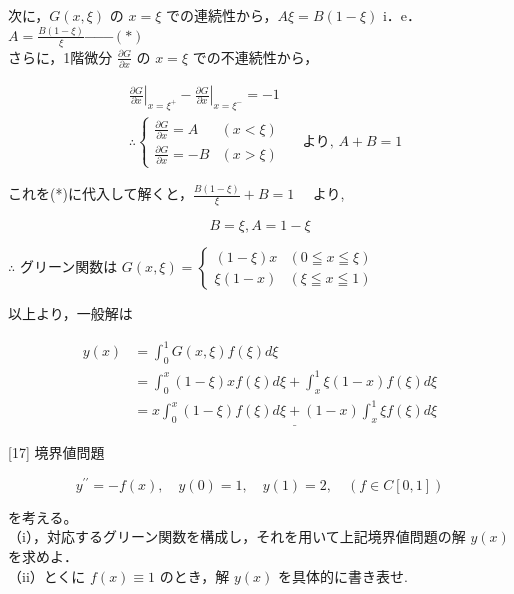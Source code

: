 \documentclass{jsarticle}
\begin{document}
次に，$G(x, \xi)$ の $x=\xi$ での連続性から，$A \xi=B(1-\xi)$ i．e．$A=\frac{B(1-\xi)}{\xi} ───(*)$\\
さらに，1階微分 $\frac{\partial G}{\partial x}$ の $x=\xi$ での不連続性から，


\begin{align*}
& \left.\frac{\partial G}{\partial x}\right|_{x=\xi^{+}}-\left.\frac{\partial G}{\partial x}\right|_{x=\xi^{-}}=-1  \tag{*}\\
& \therefore\left\{\begin{array}{ll}
\frac{\partial G}{\partial x}=A & (x<\xi) \\
\frac{\partial G}{\partial x}=-B & (x>\xi)
\end{array} \quad \text { より, } A+B=1\right.
\end{align*}


これを(*)に代入して解くと，$\frac{B(1-\xi)}{\xi}+B=1 \quad$ より,

$$
B=\xi, A=1-\xi
$$

$\therefore$ グリーン関数は $G(x, \xi)= \begin{cases}(1-\xi) x & (0 \leqq x \leqq \xi) \\ \xi(1-x) & (\xi \leqq x \leqq 1)\end{cases}$

以上より，一般解は

$$
\begin{aligned}
y(x) & =\int_{0}^{1} G(x, \xi) f(\xi) d \xi \\
& =\int_{0}^{x}(1-\xi) x f(\xi) d \xi+\int_{x}^{1} \xi(1-x) f(\xi) d \xi \\
& =\underline{x \int_{0}^{x}(1-\xi) f(\xi) d \xi+(1-x) \int_{x}^{1} \xi f(\xi) d \xi}
\end{aligned}
$$


\bigskip
\bigskip

\begin{itembox}[l]{[17]}
境界値問題


\begin{equation*}
y^{\prime \prime}=-f(x), \quad y(0)=1, \quad y(1)=2, \quad(f \in C[0,1]) \tag{28}
\end{equation*}


を考える。\\
（i），対応するグリーン関数を構成し，それを用いて上記境界値問題の解 $y(x)$ を求めよ．\\
（ii）とくに $f(x) \equiv 1$ のとき，解 $y(x)$ を具体的に書き表せ.  
\end{itembox}
\end{document}
